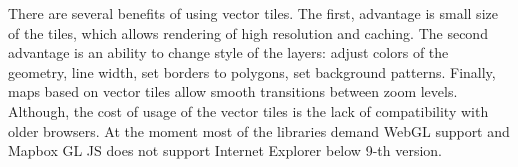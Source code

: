 There are several benefits of using vector tiles. The first, advantage is small size of the tiles,
which allows rendering of high resolution and caching. The second advantage is an ability to change
style of the layers: adjust colors of the geometry, line width, set borders to polygons,
set background patterns. Finally, maps based on vector tiles allow smooth transitions between
zoom levels. Although, the cost of usage of the vector tiles is the lack of
compatibility with older browsers. At the moment most of the libraries demand WebGL support and
Mapbox GL JS does not support Internet Explorer below 9-th version.






